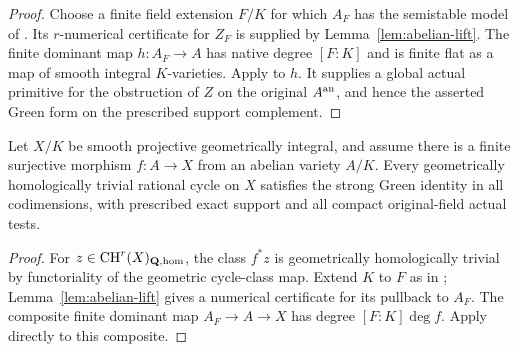 \begin{proof}
Choose a finite field extension $F/K$ for which $A_F$ has the
semistable model of .  Its $r$-numerical
certificate for $Z_F$ is supplied by
Lemma~\ref{lem:abelian-lift}.  The finite dominant map
$h:A_F\to A$ has native degree $[F:K]$ and is finite flat as
a map of smooth integral $K$-varieties.  Apply
 to $h$.  It supplies a global actual
primitive for the obstruction of $Z$ on the original
$A^{\mathrm{an}}$, and hence the asserted Green form on the prescribed
support complement.
\end{proof}

\begin{corollary}
\label{cor:finite-abelian}
Let $X/K$ be smooth projective geometrically integral, and assume
there is a finite surjective morphism $f:A\to X$ from an abelian
variety $A/K$.  Every geometrically homologically trivial rational
cycle on $X$ satisfies the strong Green identity in all
codimensions, with prescribed exact support and all compact
original-field actual tests.
\end{corollary}

\begin{proof}
For $z\in\operatorname{CH}^r(X)_{\mathbf Q,\mathrm{hom}}$, the class
$f^*z$ is geometrically homologically trivial by functoriality
of the geometric cycle-class map.  Extend $K$ to $F$ as in
; Lemma~\ref{lem:abelian-lift} gives a
numerical certificate for its pullback to $A_F$.
The composite finite dominant map $A_F\to A\to X$ has
degree $[F:K]\deg f$.  Apply 
directly to this composite.
\end{proof}
